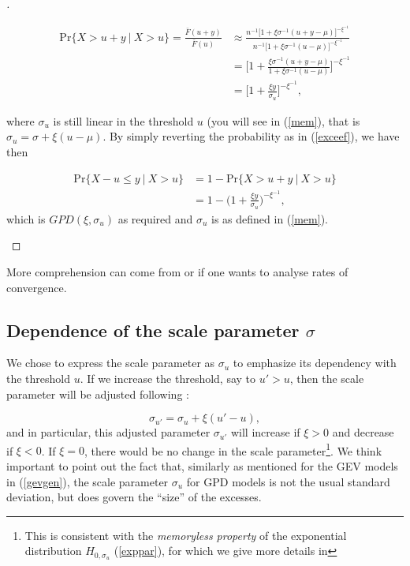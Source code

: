 \documentclass[11pt,a4paper,openany ]{book}
\begin{document}
\begin{proof}[\nopunct ]
\begin{itemize}
		
		\begin{equation*}
		\begin{aligned}
		\text{Pr}\{X>u+y\ | \ X>u\}
		= \frac{\bar{F}(u+y)}{\bar{F}(u)} 
		& \approx\frac{n^{-1}\big[1+\xi\sigma^{-1}(u+y-\mu)\big]^{-\xi^{-1}}}{n^{-1}\big[1+\xi\sigma^{-1}(u-\mu)\big]^{-\xi^{-1}}} \\  
		& = \bigg[1+\frac{\xi\sigma^{-1}(u+y-\mu)}{1+\xi\sigma^{-1}(u-\mu)}\bigg]^{-\xi^{-1}} \\
		& = \bigg[1+\frac{\xi y}{\sigma_u}\bigg]^{-\xi^{-1}},
		\end{aligned}
		\end{equation*}
		
		where $\sigma_u$ is still linear in the threshold $u$ (you will see in (\ref{mem}), that is $\sigma_u=\sigma+\xi(u-\mu)$. By simply reverting the probability  as in (\ref{exceef}), we have then 
		
		\begin{equation}
		\begin{aligned}
		\text{Pr}\{X-u\leq y\ | \ X>u\} & =1-\text{Pr}\{X>u+y\ | \ X>u\} \\
		& = 1-\bigg(1+\frac{\xi y}{\sigma_u}\bigg)^{-\xi^{-1}},
		\end{aligned}
		\end{equation}
		which is $GPD(\xi,\sigma_u)$ as required and $\sigma_u$ is as defined in 
		(\ref{mem}).
	\end{itemize}
\end{proof}
More comprehension can come from \cite[pp.27-28]{reiss_statistical_2007} or if one wants to 
analyse rates of convergence.


\subsection{Dependence of the scale parameter $\sigma$} We chose to express the scale parameter as $\sigma_u$ to emphasize its dependency with the threshold $u$. If we increase the threshold, say to $u'>u$, then the scale parameter will be adjusted following :

\begin{equation} \label{mem}
\sigma_{u'}=\sigma_u+\xi (u'-u),
\end{equation}
and in particular, this adjusted parameter $\sigma_{u'}$ will increase if $\xi>0$ and decrease if $\xi<0$.
If $\xi =0$, there would be no change in the scale parameter\footnote{This is consistent with the \emph{memoryless property} of the exponential distribution $H_{0,\sigma_u}$ (\ref{exppar}), for which we give more details in}. 
We think important to point out the fact that, similarly as mentioned for the GEV models in (\ref{gevgen}), the scale parameter $\sigma_u$ for GPD models
is not the usual standard deviation, but does govern the “size” of the excesses. \cite[pp.20]{AghaKouchak_extremes_2013}
\end{document}
